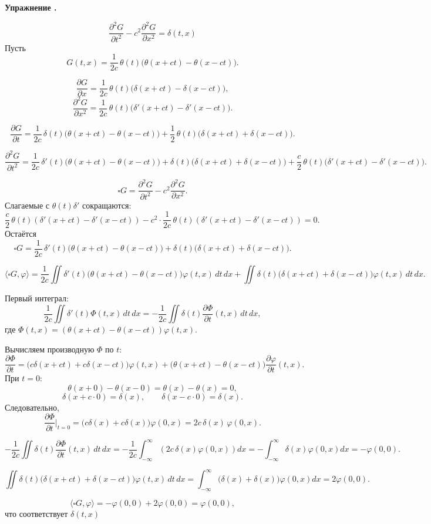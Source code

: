 \documentclass[11pt,a4paper]{report}
\numberwithin{equation}{section}
\numberwithin{figure}{chapter}
\numberwithin{table}{chapter}
\newif\ifinmathphysstatement
\newenvironment{myexe}[1][]{%
    \refstepcounter{exectr}%
    \inmathphysstatementtrue
    \begin{tcolorbox}[mathphysblock,colframe=exercisecolor,colback=exercisecolor!3,#1]
    \textbf{\color{exercisecolor}Упражнение \theexectr.}\par\smallskip
}{%
    \end{tcolorbox}
    \inmathphysstatementfalse
}
\begin{document}
\begin{myexe}\label{lol}
    \[\dfrac{\partial^2 G}{\partial t^2}-c^2\dfrac{\partial^2 G}{\partial x^2}=\delta(t, x)\]
Пусть
\[
G(t,x)=\frac{1}{2c}\,\theta(t)\bigl(\theta(x+ct)-\theta(x-ct)\bigr).
\]


\[
\frac{\partial G}{\partial x}=\frac{1}{2c}\,\theta(t)\bigl(\delta(x+ct)-\delta(x-ct)\bigr),
\]
\[
\frac{\partial^{2} G}{\partial x^{2}}=\frac{1}{2c}\,\theta(t)\bigl(\delta'(x+ct)-\delta'(x-ct)\bigr).
\]


\[
\frac{\partial G}{\partial t}=
\frac{1}{2c}\,\delta(t)\bigl(\theta(x+ct)-\theta(x-ct)\bigr)
+\frac{1}{2}\,\theta(t)\bigl(\delta(x+ct)+\delta(x-ct)\bigr).
\]

\[
\frac{\partial^{2} G}{\partial t^{2}}=
\frac{1}{2c}\,\delta'(t)\bigl(\theta(x+ct)-\theta(x-ct)\bigr)
+\delta(t)\bigl(\delta(x+ct)+\delta(x-ct)\bigr)
+\frac{c}{2}\,\theta(t)\bigl(\delta'(x+ct)-\delta'(x-ct)\bigr).
\]


\[
\square G=\frac{\partial^{2}G}{\partial t^{2}}-c^{2}\frac{\partial^{2}G}{\partial x^{2}}.
\]
Слагаемые с $\theta(t)\delta'$ сокращаются:
\[
\frac{c}{2}\,\theta(t)(\delta'(x+ct)-\delta'(x-ct))-c^{2}\cdot\frac{1}{2c}\,\theta(t)(\delta'(x+ct)-\delta'(x-ct))=0.
\]
Остаётся
\[
\square G=
\frac{1}{2c}\,\delta'(t)\bigl(\theta(x+ct)-\theta(x-ct)\bigr)
+\delta(t)\bigl(\delta(x+ct)+\delta(x-ct)\bigr).
\]


\[
\langle\square G,\varphi\rangle=
\frac{1}{2c}
\iint\delta'(t)\bigl(\theta(x+ct)-\theta(x-ct)\bigr)\varphi(t,x)\,dt\,dx
+\iint\delta(t)\bigl(\delta(x+ct)+\delta(x-ct)\bigr)\varphi(t,x)\,dt\,dx.
\]

Первый интеграл:
\[
\frac{1}{2c}\iint\delta'(t)\Phi(t,x)\,dt\,dx
=-\frac{1}{2c}\iint\delta(t)\frac{\partial\Phi}{\partial t}(t,x)\,dt\,dx,
\]
где $\Phi(t,x)=(\theta(x+ct)-\theta(x-ct))\varphi(t,x)$. 


Вычисляем производную $\Phi$ по $t$:
\[
\frac{\partial\Phi}{\partial t}=
\bigl(c\delta(x+ct)+c\delta(x-ct)\bigr)\varphi(t,x)
+\bigl(\theta(x+ct)-\theta(x-ct)\bigr)\frac{\partial\varphi}{\partial t}(t,x).
\]
При $t=0$:
\[
\theta(x+0)-\theta(x-0)=\theta(x)-\theta(x)=0,
\]
\[
\delta(x+c\cdot0)=\delta(x),\qquad
\delta(x-c\cdot0)=\delta(x).
\]
Следовательно,
\[
\frac{\partial\Phi}{\partial t}\big|_{t=0}=
\bigl(c\delta(x)+c\delta(x)\bigr)\varphi(0,x)=2c\,\delta(x)\,\varphi(0,x).
\]


\[
-\frac{1}{2c}\iint\delta(t)\frac{\partial\Phi}{\partial t}(t,x)\,dt\,dx
=-\frac{1}{2c}\int_{-\infty}^{\infty}\left(2c\,\delta(x)\varphi(0,x)\right)dx
=-\int_{-\infty}^{\infty}\delta(x)\varphi(0,x)dx=-\varphi(0,0).
\]

\[
\iint\delta(t)\bigl(\delta(x+ct)+\delta(x-ct)\bigr)\varphi(t,x)\,dt\,dx
=\int_{-\infty}^{\infty}\bigl(\delta(x)+\delta(x)\bigr)\varphi(0,x)dx=2\varphi(0,0).
\]


\[
\langle\square G,\varphi\rangle=-\varphi(0,0)+2\varphi(0,0)=\varphi(0,0),
\]
что соответствует $\delta(t, x)$
\end{myexe}
\end{document}
